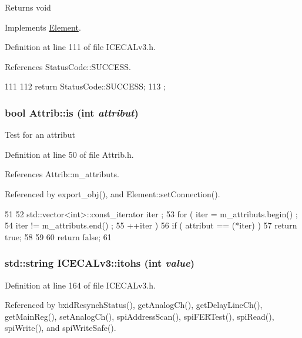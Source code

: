 \begin{DoxyReturn}{Returns}
void 
\end{DoxyReturn}


Implements \hyperlink{classElement_af42754b5cabc198869222725218d695c}{Element}.

Definition at line 111 of file ICECALv3.h.

References StatusCode::SUCCESS.


\begin{DoxyCode}
111                     {
112     return StatusCode::SUCCESS;
113   };
\end{DoxyCode}
\hypertarget{classAttrib_a704f26af560909ad22065083bb7d4c34}{
\subsubsection[{is}]{\setlength{\rightskip}{0pt plus 5cm}bool Attrib::is (int {\em attribut})}}
\label{classAttrib_a704f26af560909ad22065083bb7d4c34}
Test for an attribut 

Definition at line 50 of file Attrib.h.

References Attrib::m\_\-attributs.

Referenced by export\_\-obj(), and Element::setConnection().


\begin{DoxyCode}
51   {
52     std::vector<int>::const_iterator iter ;
53     for ( iter  = m_attributs.begin() ;
54           iter != m_attributs.end()   ;
55           ++iter ) {
56       if ( attribut == (*iter) ) {
57         return true;
58       }
59     }
60     return false;
61   }
\end{DoxyCode}
\hypertarget{classICECALv3_a04b02e583f191bfce34d05132cd23834}{
\subsubsection[{itohs}]{\setlength{\rightskip}{0pt plus 5cm}std::string ICECALv3::itohs (int {\em value})}}
\label{classICECALv3_a04b02e583f191bfce34d05132cd23834}


Definition at line 164 of file ICECALv3.h.

Referenced by bxidResynchStatus(), getAnalogCh(), getDelayLineCh(), getMainReg(), setAnalogCh(), spiAddressScan(), spiFERTest(), spiRead(), spiWrite(), and spiWriteSafe().


